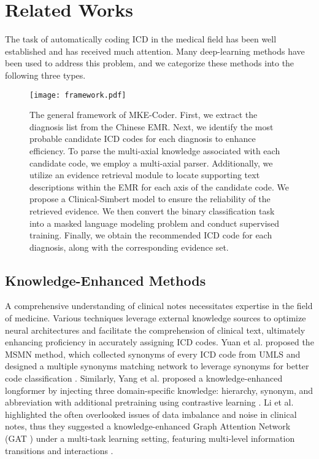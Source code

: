\section{Related Works}
\label{sec:Related Works}
The task of automatically coding ICD in the medical field has been well established and has received much attention. Many deep-learning methods have been used to address this problem, and we categorize these methods into the following three types.

    \begin{figure*}[t]
    \centering
    \texttt{[image: framework.pdf]}
    \caption{The general framework of MKE-Coder. First, we extract the diagnosis list from the Chinese EMR. Next, we identify the most probable candidate ICD codes for each diagnosis to enhance efficiency. To parse the multi-axial knowledge associated with each candidate code, we employ a multi-axial parser. Additionally, we utilize an evidence retrieval module to locate supporting text descriptions within the EMR for each axis of the candidate code. We propose a Clinical-Simbert model to ensure the reliability of the retrieved evidence. We then convert the binary classification task into a masked language modeling problem and conduct supervised training. Finally, we obtain the recommended ICD code for each diagnosis, along with the corresponding evidence set. }
    \label{fig:framework}
    \end{figure*}

\subsection{Knowledge-Enhanced Methods}

A comprehensive understanding of clinical notes necessitates expertise in the field of medicine. Various techniques leverage external knowledge sources to optimize neural architectures and facilitate the comprehension of clinical text, ultimately enhancing proficiency in accurately assigning ICD codes. 
Yuan et al. proposed the MSMN method, which collected synonyms of every ICD code from UMLS and designed a multiple synonyms matching network to leverage synonyms for better code classification \cite{yuan2022code}. Similarly, Yang et al. proposed a knowledge-enhanced longformer by injecting three domain-specific knowledge: hierarchy, synonym, and abbreviation with additional pretraining using contrastive learning \cite{yang2022knowledge}. Li et al. highlighted the often overlooked issues of data imbalance and noise in clinical notes, thus they suggested a knowledge-enhanced Graph Attention Network (GAT \cite{velivckovic2017graph}) under a multi-task learning setting, featuring multi-level information transitions and interactions \cite{li2023towards}. 


